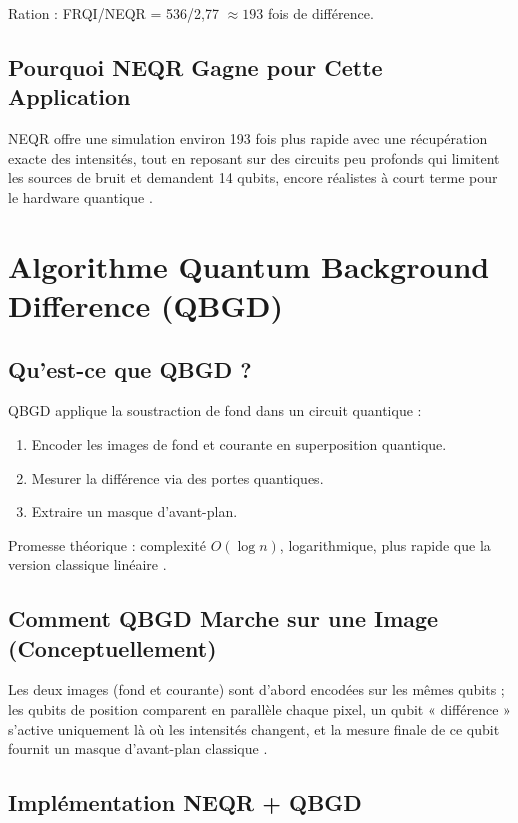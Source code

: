 \documentclass[12pt,a4paper]{report}
\begin{document}
	Ration : FRQI/NEQR = 536/2{,}77 \(\approx 193\) fois de différence.
	
	\subsection{Pourquoi NEQR Gagne pour Cette Application}
	
	NEQR offre une simulation environ 193 fois plus rapide avec une récupération exacte des intensités, tout en reposant sur des circuits peu profonds qui limitent les sources de bruit et demandent 14 qubits, encore réalistes à court terme pour le hardware quantique \cite{zhang2013neqr,yao2017qipreview}.
	
	\section{Algorithme Quantum Background Difference (QBGD)}
	
	\subsection{Qu'est-ce que QBGD ?}
	
	QBGD applique la soustraction de fond dans un circuit quantique : 
	\begin{enumerate}
		\item Encoder les images de fond et courante en superposition quantique.
		\item Mesurer la différence via des portes quantiques.
		\item Extraire un masque d'avant-plan.
	\end{enumerate}
	
	Promesse théorique : complexité \(O(\log n)\), logarithmique, plus rapide que la version classique linéaire \cite{wang2023qbgd}.
	
	\subsection{Comment QBGD Marche sur une Image (Conceptuellement)}
	
	Les deux images (fond et courante) sont d'abord encodées sur les mêmes qubits ; les qubits de position comparent en parallèle chaque pixel, un qubit « différence » s'active uniquement là où les intensités changent, et la mesure finale de ce qubit fournit un masque d'avant-plan classique \cite{wang2023qbgd}.
	
	\subsection{Implémentation NEQR + QBGD}
	
\end{document}
